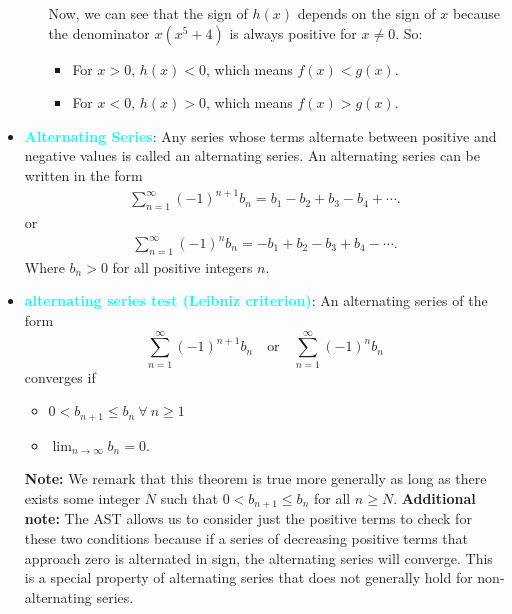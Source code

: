 \documentclass{report}
\begin{document}
\begin{itemize}
\begin{itemize}
            Now, we can see that the sign of $h(x)$ depends on the sign of $x$ because the denominator $x(x^5 + 4)$ is always positive for $x \neq 0$. So:

            \begin{itemize}
                \item For $x > 0$, $h(x) < 0$, which means $f(x) < g(x)$.
                \item For $x < 0$, $h(x) > 0$, which means $f(x) > g(x)$.
            \end{itemize}
    \end{itemize}

\item \textbf{\textcolor{cyan}{Alternating Series}}:
    Any series whose terms alternate between positive and negative values is called an alternating series. An alternating series can be written in the form 
    \begin{align*}
        \sum_{n=1}^{\infty} (-1)^{n+1} b_n = b_1 - b_2 + b_3 - b_4 + \cdots
    .\end{align*}
    or
    \begin{align*}
        \sum_{n=1}^{\infty} (-1)^n b_n = -b_1 + b_2 - b_3 + b_4 - \cdots
    .\end{align*}
    Where  $b_n > 0$  for all positive integers $n$.
\item \textbf{\textcolor{cyan}{alternating series test (Leibniz criterion)}}:
    An alternating series of the form
    \[
        \sum_{n=1}^{\infty} (-1)^{n+1} b_n \quad \text{or} \quad \sum_{n=1}^{\infty} (-1)^n b_n
    \]
    converges if
    \begin{itemize}

        \item $0 < b_{n+1} \leq b_n\ \forall\ n \geq 1$
        \item $\lim_{n \to \infty} b_n = 0.$
    \end{itemize}
    \textbf{Note:} We remark that this theorem is true more generally as long as there exists some integer \( N \) such that \( 0 < b_{n+1} \leq b_n \) for all \( n \geq N \).
    \bigbreak \noindent 
    \textbf{Additional note:} The AST allows us to consider just the positive terms to check for these two conditions because if a series of decreasing positive terms that approach zero is alternated in sign, the alternating series will converge. This is a special property of alternating series that does not generally hold for non-alternating series.


\end{itemize}
\end{document}
